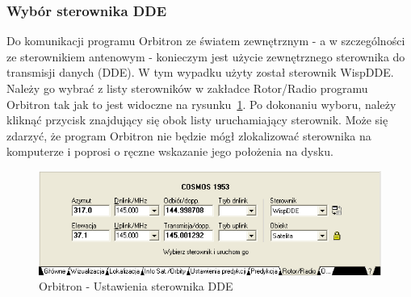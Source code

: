 \documentclass[12pt,a4paper]{article}
\begin{document}
			\subsubsection{Wybór sterownika DDE}
			Do komunikacji programu Orbitron ze światem zewnętrznym - a w szczególności ze sterownikiem antenowym - konieczym jest użycie zewnętrznego sterownika do transmisji danych (DDE). W tym wypadku użyty został sterownik WispDDE. Należy go wybrać z listy sterowników w zakładce Rotor/Radio programu Orbitron tak jak to jest widoczne na rysunku~\ref{fig:DDE_settings}. Po dokonaniu wyboru, należy kliknąć przycisk znajdujący się obok listy uruchamiający sterownik. Może się zdarzyć, że program Orbitron nie będzie mógł zlokalizować sterownika na komputerze i poprosi o ręczne wskazanie jego położenia na dysku.
			
			\begin{figure}[!htb]
				\begin{center}
					\includegraphics[scale=0.7]{screen2}
				\end{center}
				\caption{Orbitron - Ustawienia sterownika DDE}
				\label{fig:DDE_settings}
			\end{figure}
\end{document}
